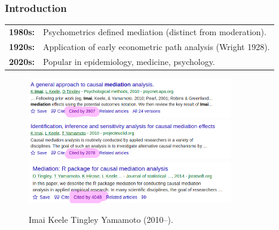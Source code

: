 \documentclass[dvipsnames,handout]{beamer} %
\begin{document}
\begin{frame}[noframenumbering]
    \frametitle{Introduction}
    \begin{tabular}{l l}
        \textbf{1980s:}
        & Psychometrics defined mediation (distinct from moderation). \\
        \textbf{1920s:} 
        & Application of early econometric path analysis (Wright 1928). \\
        \textbf{2020s:}
        & Popular in epidemiology, medicine, psychology.
    \end{tabular}
    \vskip-0.75cm
    \begin{figure}
        \centering
        \singlespacing
        \caption{Imai Keele Tingley Yamamoto (2010--).}
        \vskip-0.25cm
        \includegraphics[width=0.8\textwidth]{presentation-files/headlines/imai-2010b.png}
        \includegraphics[width=0.8\textwidth]{presentation-files/headlines/imai-2010a.png}
        \includegraphics[width=0.8\textwidth]{presentation-files/headlines/tingley-2014.png}
    \end{figure}
\end{frame}%
\end{document}
